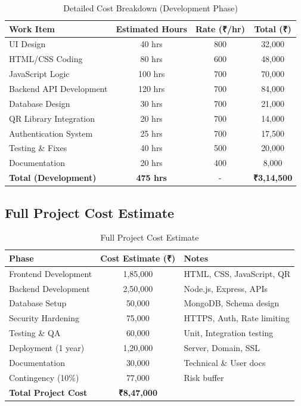 \documentclass[12pt,a4paper]{article}
\begin{document}
\begin{table}[H]
\centering
\begin{tabular}{|l|c|c|c|}
\hline
\textbf{Work Item} & \textbf{Estimated Hours} & \textbf{Rate (₹/hr)} & \textbf{Total (₹)} \\
\hline
UI Design & 40 hrs & 800 & 32,000 \\
\hline
HTML/CSS Coding & 80 hrs & 600 & 48,000 \\
\hline
JavaScript Logic & 100 hrs & 700 & 70,000 \\
\hline
Backend API Development & 120 hrs & 700 & 84,000 \\
\hline
Database Design & 30 hrs & 700 & 21,000 \\
\hline
QR Library Integration & 20 hrs & 700 & 14,000 \\
\hline
Authentication System & 25 hrs & 700 & 17,500 \\
\hline
Testing \& Fixes & 40 hrs & 500 & 20,000 \\
\hline
Documentation & 20 hrs & 400 & 8,000 \\
\hline
\textbf{Total (Development)} & \textbf{475 hrs} & - & \textbf{₹3,14,500} \\
\hline
\end{tabular}
\caption{Detailed Cost Breakdown (Development Phase)}
\end{table}

\subsection{Full Project Cost Estimate}

\begin{table}[H]
\centering
\begin{tabular}{|l|c|l|}
\hline
\textbf{Phase} & \textbf{Cost Estimate (₹)} & \textbf{Notes} \\
\hline
Frontend Development & 1,85,000 & HTML, CSS, JavaScript, QR \\
\hline
Backend Development & 2,50,000 & Node.js, Express, APIs \\
\hline
Database Setup & 50,000 & MongoDB, Schema design \\
\hline
Security Hardening & 75,000 & HTTPS, Auth, Rate limiting \\
\hline
Testing \& QA & 60,000 & Unit, Integration testing \\
\hline
Deployment (1 year) & 1,20,000 & Server, Domain, SSL \\
\hline
Documentation & 30,000 & Technical \& User docs \\
\hline
Contingency (10\%) & 77,000 & Risk buffer \\
\hline
\textbf{Total Project Cost} & \textbf{₹8,47,000} & \\
\hline
\end{tabular}
\caption{Full Project Cost Estimate}
\end{table}
\end{document}
